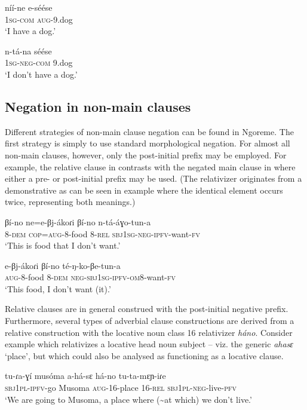 \documentclass[output=paper,colorlinks,citecolor=brown,draftmode]{langscibook}
\begin{document}
\ea\label{ex:ngo:44} 
   \gll níí-ne e-séése\\ 
        \textsc{1sg-com} \textsc{aug-}9.dog\\
    \glt ‘I have a dog.’
\z 

\ea\label{ex:ngo:45} 
    \gll n-tá-na séése\\ 
        \textsc{1sg-neg-com} 9.dog\\
    \glt ‘I don’t have a dog.’
\z 

\subsection{Negation in non-main clauses}\label{sec:ngo:2.4}

Different strategies of non-main clause negation can be found in Ngoreme. The first strategy is simply to use standard morphological negation. For almost all non-main clauses, however, only the post-initial prefix may be employed. For example, the relative clause in  contrasts with the negated main clause in  where either a pre- or post-initial prefix may be used. (The relativizer originates from a demonstrative as can be seen in example  where the identical element occurs twice, representing both meanings.)

\ea\label{ex:ngo:46} 
    \gll βí{}-no ne=e-βj-ákoɾi βí-no n-tá-áɣo-tun-a\\ 
    8-\textsc{dem} \textsc{cop=aug}{}-8-food 8\textsc{{}-rel} \textsc{sbj1sg-neg-ipfv}{}-want-\textsc{fv}\\
    \glt ‘This is food that I don’t want.’
\z 

\ea\label{ex:ngo:47} 
    \gll e-βj-ákoɾi βí-no té{}-ŋ-ko-βe-tun-a\\ 
        \textsc{aug}{}-8-food 8-\textsc{dem} \textsc{neg-sbj1sg-ipfv-om8}{}-want-\textsc{fv}\\
    \glt ‘This food, I don’t want (it).’
\z 

Relative clauses are in general construed with the post-initial negative prefix. Furthermore, several types of adverbial clause constructions are derived from a relative construction with the locative noun class 16 relativizer \textit{háno}. Consider example  which relativizes a locative head noun subject – viz. the generic \textit{ahasɛ} ‘place’, but which could also be analysed as functioning as a locative clause. 

\ea\label{ex:ngo:48} 
     \gll tu-ɾa-ɣí musóma a{}-há-sɛ há-no tu-ta-mɛɲ{}-iɾe\\ 
        \textsc{sbj}1\textsc{pl}{}-\textsc{ipfv}{}-go Musoma \textsc{aug-}16-place 16-\textsc{rel} \textsc{sbj}1\textsc{pl}{}-\textsc{neg}{}-live-\textsc{pfv}\\
     \glt ‘We are going to Musoma, a place where ({\textasciitilde}at which) we don’t live.’
\z 
\end{document}
